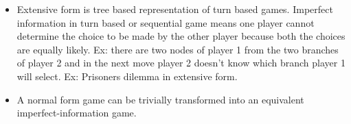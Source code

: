 \begin{itemize}
    \item Extensive form is tree based representation of turn based games. Imperfect information in turn based or sequential game means one player cannot determine the choice to be made by the other player because both the choices are equally likely. Ex: there are two  nodes of player 1 from the two branches of player 2 and in the next move player 2 doesn't know which branch player 1 will select. Ex: Prisoners dilemma in extensive form. 

    \item A normal form game can be trivially transformed into an equivalent imperfect-information game. 
\end{itemize}
